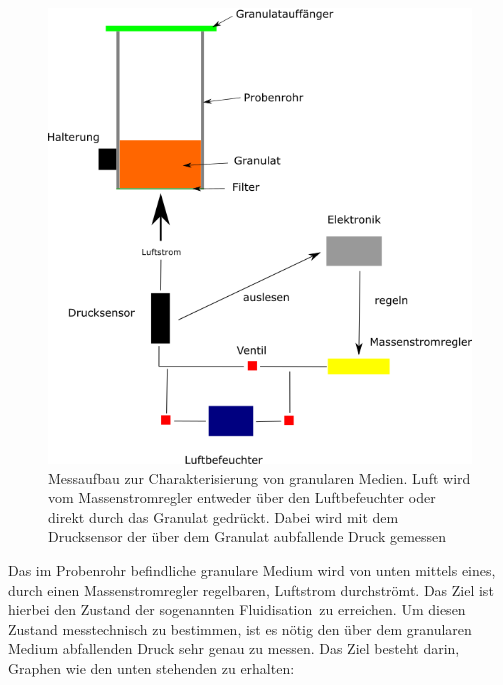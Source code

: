 \begin{figure}[h]
		\begin{center}
		\includegraphics[scale=0.65]{Prinzip_Wirbelbett.png}
		\caption{Messaufbau zur Charakterisierung von granularen Medien. Luft wird vom Massenstromregler entweder über den Luftbefeuchter oder direkt durch das Granulat gedrückt. Dabei wird mit dem Drucksensor der über dem Granulat aubfallende Druck gemessen}
	\end{center}
\end{figure}	


Das im Probenrohr befindliche granulare Medium wird von unten mittels eines, durch einen Massenstromregler regelbaren, Luftstrom durchströmt. Das Ziel ist hierbei den Zustand der sogenannten \glqq Fluidisation\grqq \ zu erreichen. Um diesen Zustand messtechnisch zu bestimmen, ist es nötig den über dem granularen Medium abfallenden Druck sehr genau zu messen. Das Ziel besteht darin, Graphen wie den unten stehenden zu erhalten:

